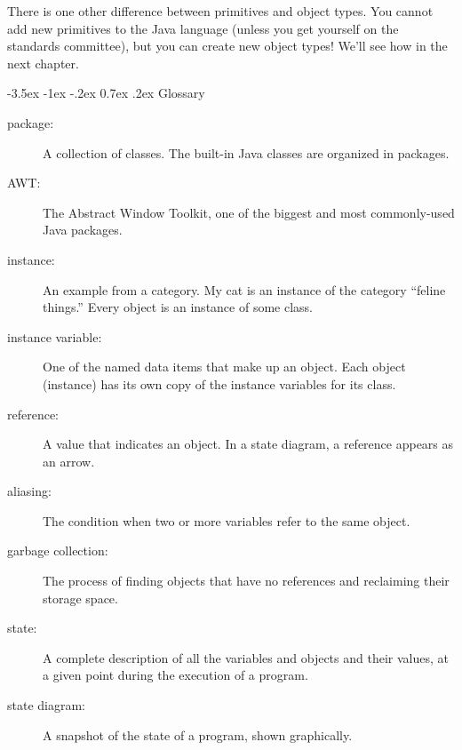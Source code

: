 \documentclass{book}
\makeatletter
\renewcommand{\section}{\@startsection 
    {section} {1} {0mm}%
    {-3.5ex \@plus -1ex \@minus -.2ex}%
    {0.7ex \@plus.2ex}%
    {\normalfont\Large\bfseries}}
\makeatother
\begin{document}
There is one other difference between primitives and object
types.  You cannot add new primitives to the Java language
(unless you get yourself on the standards committee), but
you can create new object types!  We'll see how in the next
chapter.

\section{Glossary}

\begin{description}

\item[package:]  A collection of classes.  The built-in Java
classes are organized in packages.

\item[AWT:]  The Abstract Window Toolkit, one of the biggest
and most commonly-used Java packages.

\item[instance:]  An example from a category.  My cat is an
instance of the category ``feline things.''  Every object is
an instance of some class.

\item[instance variable:]  One of the named data items that make
up an object.  Each object (instance) has its own copy of
the instance variables for its class.

\item[reference:]  A value that indicates an object.  In a
state diagram, a reference appears as an arrow.

\item[aliasing:] The condition when two or more variables refer
to the same object.

\item[garbage collection:]  The process of finding objects that
have no references and reclaiming their storage space.

\item[state:] A complete description of all the variables and
objects and their values, at a given point during the execution
of a program.

\item[state diagram:] A snapshot of the state of a program, shown
graphically.


\end{description}
\end{document}
